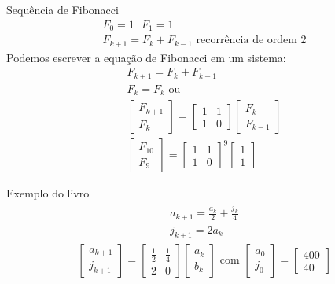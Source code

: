 \documentclass{beamer}
\begin{document}
\begin{frame}{Sequência de Fibonacci}
  \begin{gather*}
    F_0=1\text{ }F_1=1 \\
    F_{k+1}=F_k + F_{k-1} \text{ recorrência de ordem 2} 
  \end{gather*}
  Podemos escrever a equação de Fibonacci em um sistema:
  \begin{gather*}
    F_{k+1}=F_k + F_{k-1} \\
    F_k = F_k \text{ ou } \\
    \begin{bmatrix}
      F_{k+1} \\
      F_k
    \end{bmatrix}= \begin{bmatrix}
      1 & 1 \\ 1 & 0
    \end{bmatrix}\begin{bmatrix}
      F_{k} \\ F_{k-1}
    \end{bmatrix} \\
    \begin{bmatrix}
      F_{10} \\
      F_{9}
    \end{bmatrix}= \begin{bmatrix}
      1 & 1 \\ 1 &0
    \end{bmatrix}^9 \begin{bmatrix}
      1 \\ 1
    \end{bmatrix}
  \end{gather*}
  
\end{frame}

\begin{frame}{Exemplo do livro}
  \begin{gather*}
    a_{k+1} = \frac{a_k}{2} + \frac{j_k}{4} \\
    j_{k+1} = 2a_k
  \end{gather*}
  \begin{gather*}
    \begin{bmatrix}
      a_{k+1} \\
      j_{k+1}
    \end{bmatrix} = \begin{bmatrix}
      \frac{1}{2} & \frac{1}{4} \\
      2 & 0
    \end{bmatrix}\begin{bmatrix}
      a_k \\ b_k
    \end{bmatrix} \text{ com } \begin{bmatrix}
      a_0 \\ j_0 
    \end{bmatrix}= \begin{bmatrix}
      400 \\ 40
    \end{bmatrix}
  \end{gather*}
  
\end{frame}
\end{document}
